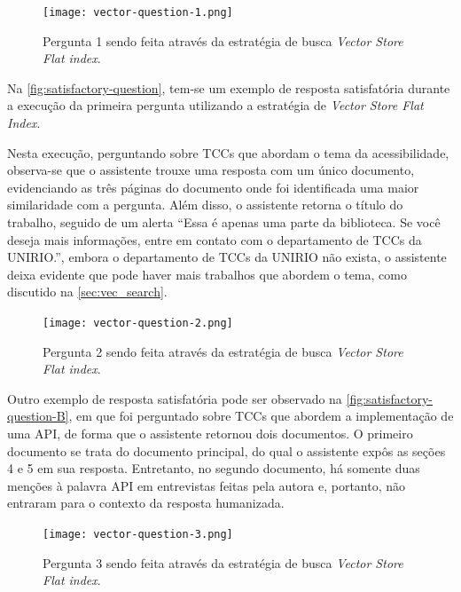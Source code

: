 \documentclass[a4paper, 12pt]{article}
\begin{document}
    
    \begin{figure}[ht]
        \texttt{[image: vector-question-1.png]}
        \centering
        \caption{Pergunta 1 sendo feita através da estratégia de busca \textit{Vector Store Flat index}.}
        \centering
        \label{fig:satisfactory-question}
    \end{figure}
    
    Na \autoref{fig:satisfactory-question}, tem-se um exemplo de resposta satisfatória durante a execução da primeira pergunta utilizando a estratégia de \textit{Vector Store Flat Index}.
    
    Nesta execução, perguntando sobre TCCs que abordam o tema da acessibilidade, observa-se que o assistente trouxe uma resposta com um único documento, evidenciando as três páginas do documento onde foi identificada uma maior similaridade com a pergunta. Além disso, o assistente retorna o título do trabalho, seguido de um alerta ``Essa é apenas uma parte da biblioteca. Se você deseja mais informações, entre em contato com o departamento de TCCs da UNIRIO.'', embora o departamento de TCCs da UNIRIO não exista, o assistente deixa evidente que pode haver mais trabalhos que abordem o tema, como discutido na \autoref{sec:vec_search}.

    \begin{figure}[ht]
        \texttt{[image: vector-question-2.png]}
        \centering
        \caption{Pergunta 2 sendo feita através da estratégia de busca \textit{Vector Store Flat index}.}
        \centering
        \label{fig:satisfactory-question-B}
    \end{figure}

    Outro exemplo de resposta satisfatória pode ser observado na \autoref{fig:satisfactory-question-B}, em que foi perguntado sobre TCCs que abordem a implementação de uma API, de forma que o assistente retornou dois documentos. O primeiro documento se trata do documento principal, do qual o assistente expôs as seções 4 e 5 em sua resposta. Entretanto, no segundo documento, há somente duas menções à palavra API em entrevistas feitas pela autora e, portanto, não entraram para o contexto da resposta humanizada.

    \clearpage
    
    \begin{figure}[ht]
        \texttt{[image: vector-question-3.png]}
        \centering
        \caption{Pergunta 3 sendo feita através da estratégia de busca \textit{Vector Store Flat index}.}
        \centering
        \label{fig:insatisfactory-question}
    \end{figure}
\end{document}

